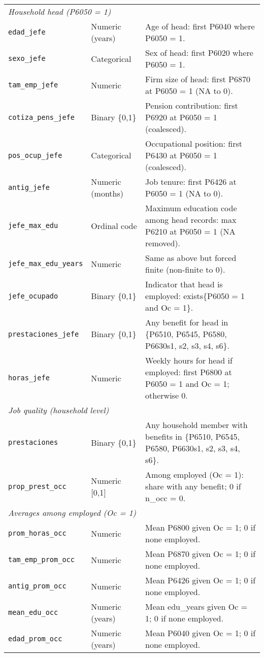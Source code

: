 \documentclass[12pt,a4paper,onecolumn]{article}
\begin{document}
\begin{longtable}{p{4cm} p{2.4cm} p{9.6cm}}
\multicolumn{3}{l}{\emph{Household head (P6050 = 1)}}\\
\texttt{edad\_jefe} & Numeric (years) & Age of head: first P6040 where P6050 = 1.\\
\texttt{sexo\_jefe} & Categorical & Sex of head: first P6020 where P6050 = 1.\\
\texttt{tam\_emp\_jefe} & Numeric & Firm size of head: first P6870 at P6050 = 1 (NA to 0).\\
\texttt{cotiza\_pens\_jefe} & Binary \{0,1\} & Pension contribution: first P6920 at P6050 = 1 (coalesced).\\
\texttt{pos\_ocup\_jefe} & Categorical & Occupational position: first P6430 at P6050 = 1 (coalesced).\\
\texttt{antig\_jefe} & Numeric (months) & Job tenure: first P6426 at P6050 = 1 (NA to 0).\\
\texttt{jefe\_max\_edu} & Ordinal code & Maximum education code among head records: max P6210 at P6050 = 1 (NA removed).\\
\texttt{jefe\_max\_edu\_years} & Numeric & Same as above but forced finite (non-finite to 0).\\
\texttt{jefe\_ocupado} & Binary \{0,1\} & Indicator that head is employed: exists\{P6050 = 1 and Oc = 1\}.\\
\texttt{prestaciones\_jefe} & Binary \{0,1\} & Any benefit for head in \{P6510, P6545, P6580, P6630s1, s2, s3, s4, s6\}.\\
\texttt{horas\_jefe} & Numeric & Weekly hours for head if employed: first P6800 at P6050 = 1 and Oc = 1; otherwise 0.\\

\multicolumn{3}{l}{\emph{Job quality (household level)}}\\
\texttt{prestaciones} & Binary \{0,1\} & Any household member with benefits in \{P6510, P6545, P6580, P6630s1, s2, s3, s4, s6\}.\\
\texttt{prop\_prest\_occ} & Numeric [0,1] & Among employed (Oc = 1): share with any benefit; 0 if n\_occ = 0.\\

\multicolumn{3}{l}{\emph{Averages among employed (Oc = 1)}}\\
\texttt{prom\_horas\_occ} & Numeric & Mean P6800 given Oc = 1; 0 if none employed.\\
\texttt{tam\_emp\_prom\_occ} & Numeric & Mean P6870 given Oc = 1; 0 if none employed.\\
\texttt{antig\_prom\_occ} & Numeric & Mean P6426 given Oc = 1; 0 if none employed.\\
\texttt{mean\_edu\_occ} & Numeric (years) & Mean edu\_years given Oc = 1; 0 if none employed.\\
\texttt{edad\_prom\_occ} & Numeric (years) & Mean P6040 given Oc = 1; 0 if none employed.\\


\end{longtable}
\end{document}

